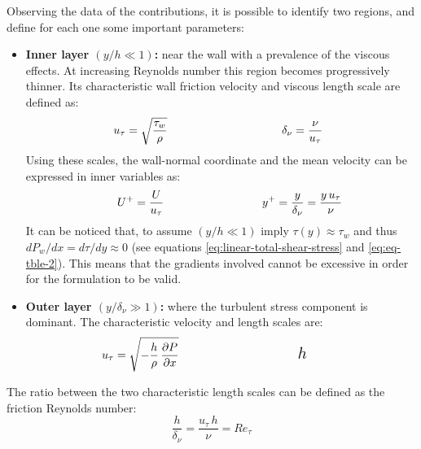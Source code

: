 \documentclass[12pt, a4paper, twoside, openright]{book}
\begin{document}
Observing the data of the contributions, it is possible to identify two regions, and define for each one some important parameters:
\begin{itemize}
	\item \textbf{Inner layer $(y/h \ll 1)$:} near the wall with a prevalence of the viscous effects. At increasing Reynolds number this region becomes progressively thinner. Its characteristic wall friction velocity and viscous length scale are defined as:
	      \begin{equation}
		      \makebox[5.0cm][c]{$\displaystyle u_\tau = \sqrt{\frac{\tau_w}{\rho}}$}
		      \makebox[5.0cm][c]{$\displaystyle \delta_{\nu} = \frac{\nu}{u_\tau}$}
	      \end{equation}
	      Using these scales, the wall-normal coordinate and the mean velocity can be expressed in inner variables as:
	      \begin{equation}
		      \makebox[5.0cm][c]{$\displaystyle U^+ = \frac{U}{u_\tau}$}
		      \makebox[5.0cm][c]{$\displaystyle y^+ = \frac{y}{\delta_\nu} = \frac{y \, u_\tau}{\nu}$}
	      \end{equation}
	      It can be noticed that, to assume $(y/h \ll 1)$ imply $\tau(y) \approx \tau_w$ and thus $d P_w / d x = d \tau / dy \approx 0$ (see equations \eqref{eq:linear-total-shear-stress} and \eqref{eq:eq-tble-2}). This means that the gradients involved cannot be excessive in order for the formulation to be valid.
	\item \textbf{Outer layer $(y/\delta_{\nu} \gg 1)$:} where the turbulent stress component is dominant. The characteristic velocity and length scales are:
	      \begin{equation}
		      \makebox[5.0cm][c]{$\displaystyle u_\tau = \sqrt{-\frac{h}{\rho}\, \frac{\partial P}{\partial x}}$}
		      \makebox[5.0cm][c]{{\Large $h$}}
	      \end{equation}
\end{itemize}
The ratio between the two characteristic length scales can be defined as the friction Reynolds number:
\begin{equation}
	\frac{h}{\delta_{\nu}} = \frac{u_{\tau} \, h}{\nu} = Re_{\tau}
\end{equation}
\end{document}

